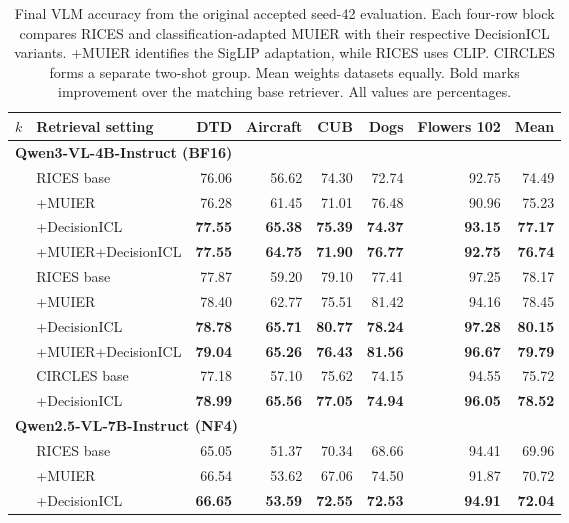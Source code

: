\documentclass[10pt,twocolumn,letterpaper]{article}
\begin{document}
\begin{table}[t]
\caption{Final VLM accuracy from the original accepted seed-42 evaluation. Each four-row block compares RICES and classification-adapted MUIER with their respective DecisionICL variants. +MUIER identifies the SigLIP adaptation, while RICES uses CLIP. CIRCLES forms a separate two-shot group. Mean weights datasets equally. Bold marks improvement over the matching base retriever. All values are percentages.}
\label{tab:main}
\centering\small
\setlength{\tabcolsep}{3pt}
\begin{tabular}{llrrrrrr}
\toprule
$k$ & Retrieval setting & DTD & Aircraft & CUB & Dogs & Flowers 102 & Mean \\
\midrule
\multicolumn{8}{l}{\textbf{Qwen3-VL-4B-Instruct (BF16)}} \\
\addlinespace[2pt]
1 & RICES base & 76.06 & 56.62 & 74.30 & 72.74 & 92.75 & 74.49 \\
 & +MUIER & 76.28 & 61.45 & 71.01 & 76.48 & 90.96 & 75.23 \\
 & +DecisionICL & \textbf{77.55} & \textbf{65.38} & \textbf{75.39} & \textbf{74.37} & \textbf{93.15} & \textbf{77.17} \\
 & +MUIER+DecisionICL & \textbf{77.55} & \textbf{64.75} & \textbf{71.90} & \textbf{76.77} & \textbf{92.75} & \textbf{76.74} \\
\addlinespace[3pt]
2 & RICES base & 77.87 & 59.20 & 79.10 & 77.41 & 97.25 & 78.17 \\
 & +MUIER & 78.40 & 62.77 & 75.51 & 81.42 & 94.16 & 78.45 \\
 & +DecisionICL & \textbf{78.78} & \textbf{65.71} & \textbf{80.77} & \textbf{78.24} & \textbf{97.28} & \textbf{80.15} \\
 & +MUIER+DecisionICL & \textbf{79.04} & \textbf{65.26} & \textbf{76.43} & \textbf{81.56} & \textbf{96.67} & \textbf{79.79} \\
\addlinespace[3pt]
2 & CIRCLES base & 77.18 & 57.10 & 75.62 & 74.15 & 94.55 & 75.72 \\
 & +DecisionICL & \textbf{78.99} & \textbf{65.56} & \textbf{77.05} & \textbf{74.94} & \textbf{96.05} & \textbf{78.52} \\
\midrule
\multicolumn{8}{l}{\textbf{Qwen2.5-VL-7B-Instruct (NF4)}} \\
\addlinespace[2pt]
1 & RICES base & 65.05 & 51.37 & 70.34 & 68.66 & 94.41 & 69.96 \\
 & +MUIER & 66.54 & 53.62 & 67.06 & 74.50 & 91.87 & 70.72 \\
 & +DecisionICL & \textbf{66.65} & \textbf{53.59} & \textbf{72.55} & \textbf{72.53} & \textbf{94.91} & \textbf{72.04} \\

\end{tabular}
\end{table}
\end{document}
